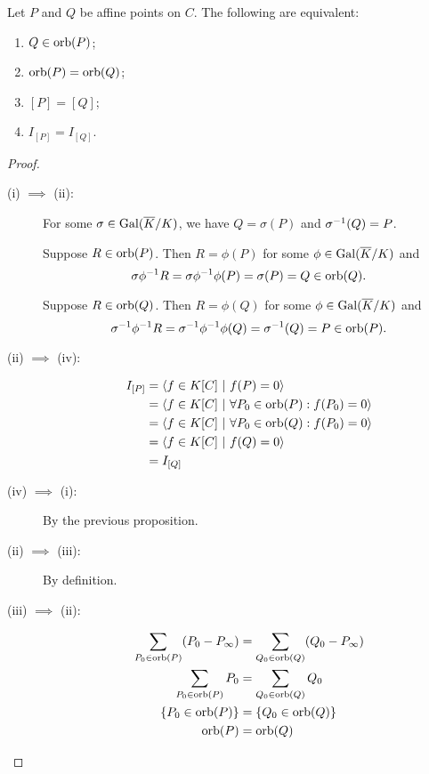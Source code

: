 \begin{corollary}
  Let $P$ and $Q$ be affine points on $C$. The following are equivalent:
  \begin{enumerate}[label=\roman*]
    \item $Q \in \operatorname{orb}(P)$;
    \item $\operatorname{orb}(P) = \operatorname{orb}(Q)$;
    \item $[P] = [Q]$;
    \item $I_{[P]} = I_{[Q]}$.
  \end{enumerate}
\end{corollary}
\begin{proof}
  \begin{description}
    \item [(i) $\implies$ (ii):]
      For some $\sigma \in \operatorname{Gal}(\overline K/K)$, we have $Q = \sigma(P)$ and $\sigma^{-1}(Q) = P$.
      
      Suppose $R \in \operatorname{orb}(P)$.
      Then $R = \phi(P)$ for some $\phi \in \operatorname{Gal}(\overline K/K)$ and
      \[ \sigma\phi^{-1} R = \sigma\phi^{-1}\phi(P) = \sigma(P) = Q \in \operatorname{orb}(Q). \]
      
      Suppose $R \in \operatorname{orb}(Q)$.
      Then $R = \phi(Q)$ for some $\phi \in \operatorname{Gal}(\overline K/K)$ and
      \[ \sigma^{-1}\phi^{-1} R = \sigma^{-1}\phi^{-1}\phi(Q) = \sigma^{-1}(Q) = P \in \operatorname{orb}(P). \]
    

    \item [(ii) $\implies$ (iv):]
      \begin{align*}
        I_{[P]}
          &= \left\langle  f \in K[C] ~|~ f(P) = 0  \right\rangle \\
          &= \left\langle  f \in K[C] ~|~ \forall P_0 \in \operatorname{orb}(P) : f(P_0) = 0  \right\rangle \\
          &= \left\langle  f \in K[C] ~|~ \forall P_0 \in \operatorname{orb}(Q) : f(P_0) = 0  \right\rangle \\
          &= \left\langle  f \in K[C] ~|~ f(Q) = 0  \right\rangle \\
          &= I_{[Q]}
      \end{align*}
      
    \item [(iv) $\implies$ (i):]
      By the previous proposition.
    
    \item [(ii) $\implies$ (iii):]
      By definition.

    \item [(iii) $\implies$ (ii):]
      \begin{align*}
        \sum_{P_0 \in \operatorname{orb}(P)}(P_0 - P_\infty) &= \sum_{Q_0 \in \operatorname{orb}(Q)}(Q_0 - P_\infty) \\
        \sum_{P_0 \in \operatorname{orb}(P)}P_0 &= \sum_{Q_0 \in \operatorname{orb}(Q)}Q_0 \\
        \{P_0 \in \operatorname{orb}(P)\} &= \{Q_0 \in \operatorname{orb}(Q)\} \\
        \operatorname{orb}(P) &= \operatorname{orb}(Q)
      \end{align*}
  \end{description}
\end{proof}


